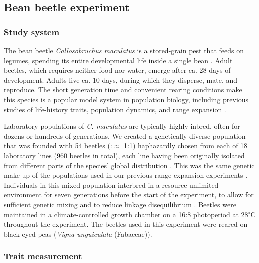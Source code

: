 \documentclass[11pt]{article}
\begin{document}
\subsection*{Bean beetle experiment}

\subsubsection*{Study system}

The bean beetle \textit{Callosobruchus maculatus} is a stored-grain pest that feeds on legumes, spending its entire developmental life inside a single bean \citep{fujii_behavioral_1990}.
Adult beetles, which requires neither food nor water, emerge after ca. 28 days of development.
Adults live ca. 10 days, during which they disperse, mate, and reproduce.
The short generation time and convenient rearing conditions make this species is a popular model system in population biology, including previous studies of life-history traits, population dynamics, and range expansion \citep{bellows_analytical_1982,fujii_behavioral_1990,miller_confronting_2011,miller_sex_2013,wagner_genetic_2016,ochocki_rapid_2017}.

Laboratory populations of \textit{C. maculatus} are typically highly inbred, often for dozens or hundreds of generations.
We created a genetically diverse population that was founded with 54 beetles (\female:\mars $\approx$ 1:1) haphazardly chosen from each of 18 laboratory lines (960 beetles in total), each line having been originally isolated from different parts of the species’ global distribution \citep{downey_comparative_2015}.
This was the same genetic make-up of the populations used in our previous range expansion experiments \citep{ochocki_rapid_2017}.
Individuals in this mixed population interbred in a resource-unlimited environment for seven generations before the start of the experiment, to allow for sufficient genetic mixing and to reduce linkage disequilibrium \citep{roughgarden_theory_1979,ochocki_rapid_2017}.
Beetles were maintained in a climate-controlled growth chamber on a 16:8 photoperiod at 28$^{\circ}$C throughout the experiment.
The beetles used in this experiment were reared on black-eyed peas (\textit{Vigna unguiculata} (Fabaceae)). %

\subsubsection*{Trait measurement}
\end{document}
